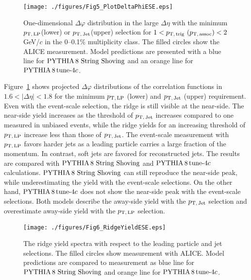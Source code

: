 \begin{figure}[h!]
	\centering
	\texttt{[image: ./figures/Fig5\_PlotDeltaPhiESE.eps]}
	\caption{ One-dimensional $\Delta\varphi$ distribution in the large $\Delta\eta$ with the minimum $p_\mathrm{T,\,LP}$(lower) or $p_\mathrm{T,\,Jet}$(upper) selection for $1< p_\mathrm{T,\,trig}~\mathrm (p_\mathrm{T,\,assoc}) <2$ GeV/$c$ in the 0--0.1\% multiplicity class. The filled circles show the ALICE measurement. Model predictions are presented with a blue line for ${\mathrm{PYTHIA}\,8~\mathrm{String}~}\mathrm{Shoving}$  and an orange line for $\mathrm{PYTHIA}\,8\,\mathrm{tune}{\text -}4c$.}
	\label{fig:PlotDeltaPhiESE}
\end{figure}

Figure~\ref{fig:PlotDeltaPhiESE} shows projected $\Delta\varphi$ distributions of the correlation functions in $1.6<|\Delta\eta|<1.8$ for the minimum $p_\mathrm{T,\,LP}$ (lower) and $p_\mathrm{T,\,Jet}$ (upper) requirement. Even with the event-scale selection, the ridge is still visible at the near-side. The near-side yield increases as the threshold of $p_\mathrm{T,\,Jet}$ increases compared to one measured in unbiased events, while the ridge yields for an increasing threshold of $p_\mathrm{T,\,LP}$ increase less than those of $p_\mathrm{T,\,Jet}$. The event-scale measurement with $p_\mathrm{T,\,LP}$ favors harder jets as a leading particle carries a large fraction of the momentum. In contrast, soft jets are favored for reconstructed jets. The results are compared with ${\mathrm{PYTHIA}\,8~\mathrm{String}~}\mathrm{Shoving}$ and $\mathrm{PYTHIA}\,8\,\mathrm{tune}{\text -}4c$ calculations. ${\mathrm{PYTHIA}\,8~\mathrm{String}~}\mathrm{Shoving}$ can still reproduce the near-side peak, while underestimating the yield with the event-scale selections. On the other hand, $\mathrm{PYTHIA}\,8\,\mathrm{tune}{\text -}4c$ does not show the near-side peak with the event-scale selections. Both models describe the away-side yield with the $p_\mathrm{T,\,Jet}$ selection and overestimate away-side yield with the $p_\mathrm{T,\,LP}$ selection.

\begin{figure}[h!]
	\centering
	\texttt{[image: ./figures/Fig6\_RidgeYieldESE.eps]}
	\caption{The ridge yield spectra with respect to the leading particle and jet selections. The filled circles show measurement with ALICE. Model predictions are compared to measurement as blue line for ${\mathrm{PYTHIA}\,8~\mathrm{String}~}\mathrm{Shoving}$ and orange line for $\mathrm{PYTHIA}\,8\,\mathrm{tune}{\text -}4c$.}
	\label{fig:RidgeYield_ESE}
\end{figure}

